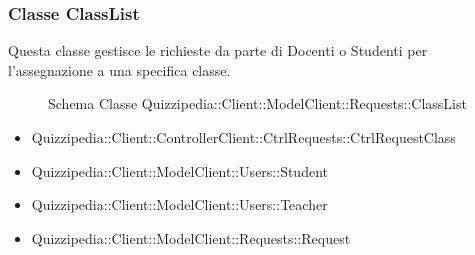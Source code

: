 \subsubsection{Classe ClassList}
Questa classe gestisce le richieste da parte di Docenti o Studenti per l'assegnazione a una specifica classe.
\begin{figure}[H]
\centering
\noindent{}
\caption[Schema Classe ClassList]{Schema Classe Quizzipedia::Client::ModelClient::Requests::ClassList}
\end{figure}
\begin{itemize}
\item Quizzipedia::Client::ControllerClient::CtrlRequests::CtrlRequestClass
\item Quizzipedia::Client::ModelClient::Users::Student
\item Quizzipedia::Client::ModelClient::Users::Teacher
\end{itemize}
\begin{itemize}
\item Quizzipedia::Client::ModelClient::Requests::Request
\end{itemize}
